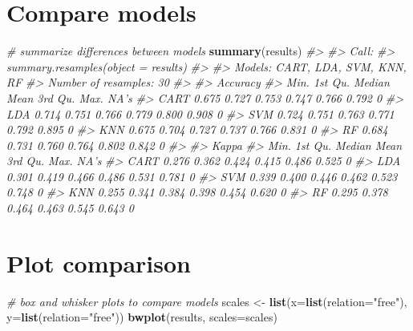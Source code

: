 \documentclass[]{book}
\newenvironment{Shaded}{\begin{snugshade}}{\end{snugshade}}
\newcommand{\CommentTok}[1]{\textcolor[rgb]{0.56,0.35,0.01}{\textit{#1}}}
\newcommand{\DataTypeTok}[1]{\textcolor[rgb]{0.13,0.29,0.53}{#1}}
\newcommand{\KeywordTok}[1]{\textcolor[rgb]{0.13,0.29,0.53}{\textbf{#1}}}
\newcommand{\NormalTok}[1]{#1}
\newcommand{\StringTok}[1]{\textcolor[rgb]{0.31,0.60,0.02}{#1}}
\begin{document}
\hypertarget{compare-models}{%
\section{Compare models}\label{compare-models}}

\begin{Shaded}
\begin{Highlighting}[]
\CommentTok{# summarize differences between models}
\KeywordTok{summary}\NormalTok{(results)}
\CommentTok{#> }
\CommentTok{#> Call:}
\CommentTok{#> summary.resamples(object = results)}
\CommentTok{#> }
\CommentTok{#> Models: CART, LDA, SVM, KNN, RF }
\CommentTok{#> Number of resamples: 30 }
\CommentTok{#> }
\CommentTok{#> Accuracy }
\CommentTok{#>       Min. 1st Qu. Median  Mean 3rd Qu.  Max. NA's}
\CommentTok{#> CART 0.675   0.727  0.753 0.747   0.766 0.792    0}
\CommentTok{#> LDA  0.714   0.751  0.766 0.779   0.800 0.908    0}
\CommentTok{#> SVM  0.724   0.751  0.763 0.771   0.792 0.895    0}
\CommentTok{#> KNN  0.675   0.704  0.727 0.737   0.766 0.831    0}
\CommentTok{#> RF   0.684   0.731  0.760 0.764   0.802 0.842    0}
\CommentTok{#> }
\CommentTok{#> Kappa }
\CommentTok{#>       Min. 1st Qu. Median  Mean 3rd Qu.  Max. NA's}
\CommentTok{#> CART 0.276   0.362  0.424 0.415   0.486 0.525    0}
\CommentTok{#> LDA  0.301   0.419  0.466 0.486   0.531 0.781    0}
\CommentTok{#> SVM  0.339   0.400  0.446 0.462   0.523 0.748    0}
\CommentTok{#> KNN  0.255   0.341  0.384 0.398   0.454 0.620    0}
\CommentTok{#> RF   0.295   0.378  0.464 0.463   0.545 0.643    0}
\end{Highlighting}
\end{Shaded}

\hypertarget{plot-comparison}{%
\section{Plot comparison}\label{plot-comparison}}

\begin{Shaded}
\begin{Highlighting}[]
\CommentTok{# box and whisker plots to compare models}
\NormalTok{scales <-}\StringTok{ }\KeywordTok{list}\NormalTok{(}\DataTypeTok{x=}\KeywordTok{list}\NormalTok{(}\DataTypeTok{relation=}\StringTok{"free"}\NormalTok{), }\DataTypeTok{y=}\KeywordTok{list}\NormalTok{(}\DataTypeTok{relation=}\StringTok{"free"}\NormalTok{))}
\KeywordTok{bwplot}\NormalTok{(results, }\DataTypeTok{scales=}\NormalTok{scales)}
\end{Highlighting}
\end{Shaded}
\end{document}
